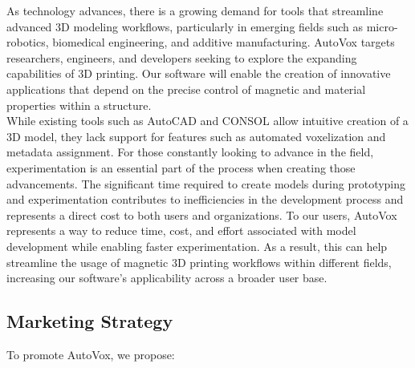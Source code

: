 \documentclass[12pt, titlepage]{article}
\begin{document}
As technology advances, there is a growing demand for tools that streamline advanced 3D modeling workflows, particularly in emerging fields such as micro-robotics, biomedical engineering, and additive manufacturing. AutoVox targets researchers, engineers, and developers seeking to explore the expanding capabilities of 3D printing. Our software will enable the creation of innovative applications that depend on the precise control of magnetic and material properties within a structure.\\

While existing tools such as AutoCAD and CONSOL allow intuitive creation of a 3D model, they lack support for features such as automated voxelization and metadata assignment. For those constantly looking to advance in the field, experimentation is an essential part of the process when creating those advancements. The significant time required to create models during prototyping and experimentation contributes to inefficiencies in the development process and represents a direct cost to both users and organizations. To our users, AutoVox represents a way to reduce time, cost, and effort associated with model development while enabling faster experimentation. As a result, this can help streamline the usage of magnetic 3D printing workflows within different fields, increasing our software's applicability across a broader user base.

\subsection{Marketing Strategy}

To promote AutoVox, we propose:
\end{document}
